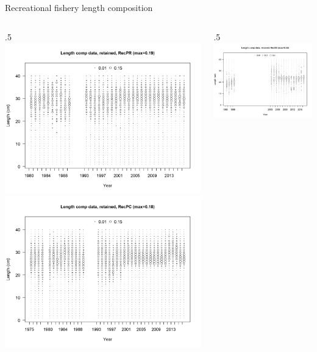 \documentclass[ignorenonframetext,compress]{beamer}
\def\begincols{\begin{columns}}
\def\begincol{\begin{column}}
\def\endcol{\end{column}}
\def\endcols{\end{columns}}
\begin{document}
\begin{frame}{Recreational fishery length composition}

\begincols
 \begincol{.5\textwidth}
\includegraphics{r4ss/plots_mod1/comp_lendat_bubflt4mkt2.png}
\includegraphics{r4ss/plots_mod1/comp_lendat_bubflt5mkt2_page2.png}
\endcol
 \begincol{.5\textwidth}
\includegraphics{r4ss/plots_mod1/comp_lendat_bubflt6mkt2.png} \endcol
\endcols


\end{frame}
\end{document}
